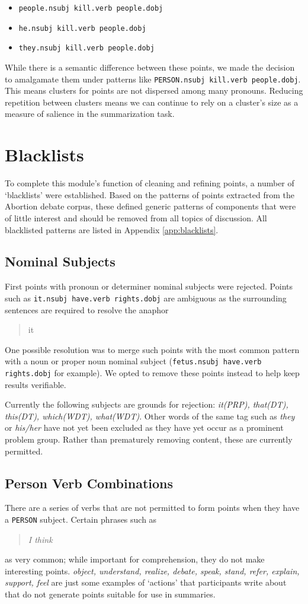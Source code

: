     \begin{itemize}
      \item{\texttt{people.nsubj kill.verb people.dobj}}
      \item{\texttt{he.nsubj kill.verb people.dobj}}
      \item{\texttt{they.nsubj kill.verb people.dobj}}
    \end{itemize}

    While there is a semantic difference between these points, we made the decision to amalgamate them under patterns like \texttt{PERSON.nsubj kill.verb people.dobj}. This means clusters for points are not dispersed among many pronouns. Reducing repetition between clusters means we can continue to rely on a cluster's size as a measure of salience in the summarization task.

  \section{Blacklists}
  To complete this module's function of cleaning and refining points, a number of `blacklists' were established. Based on the patterns of points extracted from the Abortion debate corpus, these defined generic patterns of components that were of little interest and should be removed from all topics of discussion. All blacklisted patterns are listed in Appendix \ref{app:blacklists}.

    \tocless\subsection{Nominal Subjects}
    First points with pronoun or determiner nominal subjects were rejected. Points such as \texttt{it.nsubj have.verb rights.dobj} are ambiguous as the surrounding sentences are required to resolve the anaphor \blockquote{it}. One possible resolution was to merge such points with the most common pattern with a noun or proper noun nominal subject (\texttt{fetus.nsubj have.verb rights.dobj} for example). We opted to remove these points instead to help keep results verifiable.

      Currently the following subjects are grounds for rejection: \textit{it(PRP), that(DT), this(DT), which(WDT), what(WDT)}. Other words of the same tag such as \textit{they} or \textit{his/her} have not yet been excluded as they have yet occur as a prominent problem group. Rather than prematurely removing content, these are currently permitted.

    \tocless\subsection{Person Verb Combinations}
    There are a series of verbs that are not permitted to form points when they have a \texttt{PERSON} subject. Certain phrases such as \blockquote{\textit{I think}} as very common; while important for comprehension, they do not make interesting points. \textit{object, understand, realize, debate, speak, stand, refer, explain, support, feel} are just some examples of `actions' that participants write about that do not generate points suitable for use in summaries.

